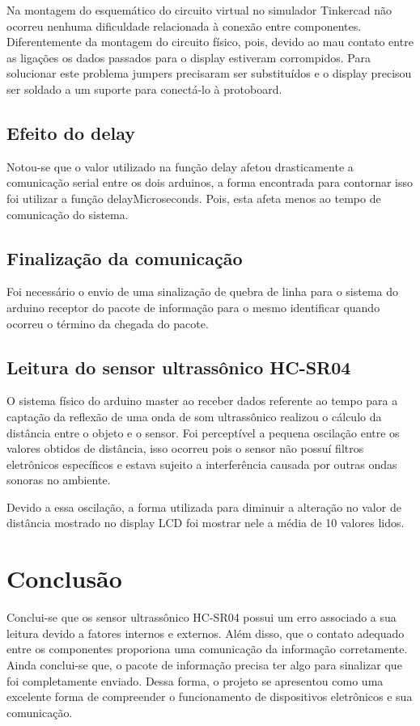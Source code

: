 \documentclass[conference]{IEEEtran}
\begin{document}
Na montagem do esquemático do circuito virtual no simulador Tinkercad não ocorreu nenhuma dificuldade relacionada à conexão entre componentes.
Diferentemente da montagem do circuito físico, pois, devido ao mau contato entre as ligações os dados passados para o display estiveram corrompidos. Para solucionar este problema jumpers precisaram ser substituídos
e o display precisou ser soldado a um suporte para conectá-lo à protoboard.

\subsection{Efeito do delay}
Notou-se que o valor utilizado na função delay afetou drasticamente a comunicação serial entre os dois arduinos, a forma encontrada para contornar isso foi utilizar a função delayMicroseconds. Pois, esta afeta menos ao tempo de comunicação do sistema.

\subsection{Finalização da comunicação}
Foi necessário o envio de uma sinalização de quebra de linha para o sistema do arduino receptor do pacote de informação para o mesmo identificar quando ocorreu o término da chegada do pacote.

\subsection{Leitura do sensor ultrassônico HC-SR04}

O sistema físico do arduino master ao receber dados referente ao tempo para a captação da reflexão de uma onda de som ultrassônico realizou o cálculo da distância entre o objeto e o sensor.
Foi perceptível a pequena oscilação entre os valores obtidos de distância, isso ocorreu pois o sensor não possuí filtros eletrônicos específicos e estava sujeito a interferência causada por outras ondas sonoras no ambiente.

Devido a essa oscilação, a forma utilizada para diminuir a alteração no valor de distância mostrado no display LCD foi mostrar nele a média de 10 valores lidos.

\section{Conclusão}
Conclui-se que os sensor ultrassônico HC-SR04 possui um erro associado a sua leitura devido a fatores internos e externos.
Além disso, que o contato adequado entre os componentes proporiona uma comunicação da informação corretamente. Ainda conclui-se que, o pacote de informação precisa ter algo para sinalizar que foi completamente enviado.
Dessa forma, o projeto se apresentou como uma excelente forma de compreender o funcionamento de dispositivos eletrônicos e sua comunicação.
\end{document}
